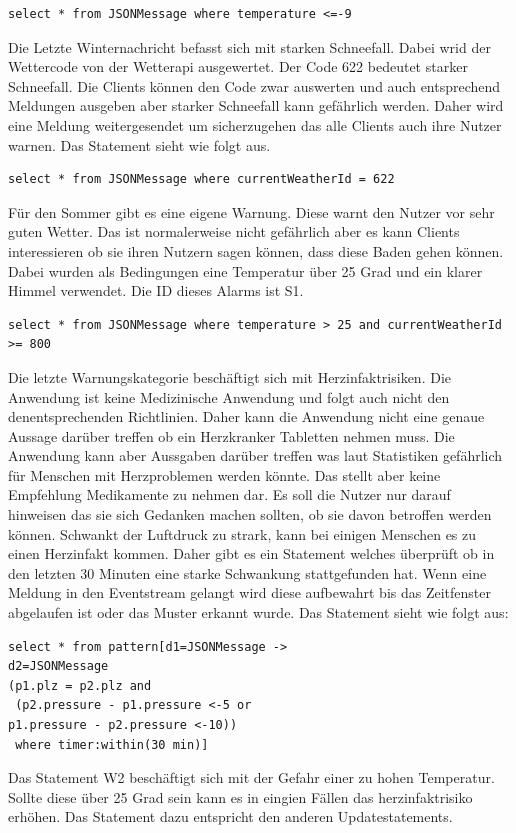 \begin{lstlisting}
select * from JSONMessage where temperature <=-9
\end{lstlisting}
Die Letzte Winternachricht befasst sich mit starken Schneefall. Dabei wrid der Wettercode von der Wetterapi ausgewertet. Der Code 622 bedeutet starker Schneefall. Die Clients können den Code zwar auswerten und auch entsprechend Meldungen ausgeben aber starker Schneefall kann gefährlich werden. Daher wird eine Meldung weitergesendet um sicherzugehen das alle Clients auch ihre Nutzer warnen. Das Statement sieht wie folgt aus. 
\begin{lstlisting}
select * from JSONMessage where currentWeatherId = 622
\end{lstlisting}  
Für den Sommer gibt es eine eigene Warnung. Diese warnt den Nutzer vor sehr guten Wetter. Das ist normalerweise nicht gefährlich aber es kann Clients interessieren ob sie ihren Nutzern sagen können, dass diese Baden gehen können. Dabei wurden als Bedingungen eine Temperatur über 25 Grad und ein klarer Himmel verwendet. Die ID dieses Alarms ist S1. 
\begin{lstlisting}
select * from JSONMessage where temperature > 25 and currentWeatherId >= 800
\end{lstlisting}
Die letzte Warnungskategorie beschäftigt sich mit Herzinfaktrisiken. Die Anwendung ist keine Medizinische Anwendung und folgt auch nicht den denentsprechenden Richtlinien. Daher kann die Anwendung nicht eine genaue Aussage darüber treffen ob ein Herzkranker Tabletten nehmen muss. Die Anwendung kann aber Aussgaben darüber treffen was laut Statistiken gefährlich für Menschen mit Herzproblemen werden könnte. Das stellt aber keine Empfehlung Medikamente zu nehmen dar. Es soll die Nutzer nur darauf hinweisen das sie sich Gedanken machen sollten, ob sie davon betroffen werden können. 
 Schwankt der Luftdruck zu strark, kann bei einigen Menschen es zu einen Herzinfakt kommen. Daher gibt es ein Statement welches überprüft ob in den letzten 30 Minuten eine starke Schwankung stattgefunden hat. Wenn eine Meldung in den Eventstream gelangt wird diese aufbewahrt bis das Zeitfenster abgelaufen ist oder das Muster erkannt wurde. Das Statement sieht wie folgt aus:

\begin{lstlisting}
select * from pattern[d1=JSONMessage ->
d2=JSONMessage
(p1.plz = p2.plz and
 (p2.pressure - p1.pressure <-5 or 
p1.pressure - p2.pressure <-10))
 where timer:within(30 min)]
\end{lstlisting} Das Statement W2 beschäftigt sich mit der Gefahr einer zu hohen Temperatur. Sollte diese über 25 Grad sein kann es in eingien Fällen das herzinfaktrisiko erhöhen. Das Statement dazu entspricht den anderen Updatestatements. 


